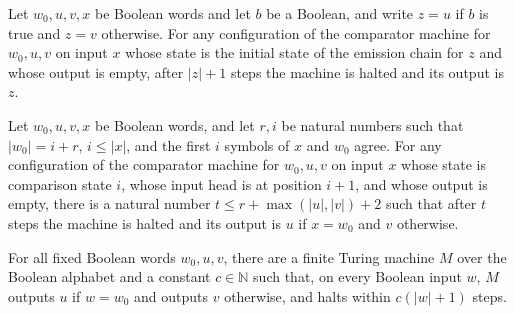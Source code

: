 \begin{lemma}
\label{Turing.FinTM.ifEq_finish}
\leanok
{}
Let $w_0,u,v,x$ be Boolean words and let $b$ be a Boolean, and write $z=u$ if $b$ is
true and $z=v$ otherwise. For any configuration of the comparator machine for $w_0,u,v$
on input $x$ whose state is the initial state of the emission chain for $z$ and whose
output is empty, after $|z|+1$ steps the machine is halted and its output is $z$.
\end{lemma}

\begin{lemma}
\label{Turing.FinTM.ifEq_run}
\leanok
{}
Let $w_0,u,v,x$ be Boolean words, and let $r,i$ be natural numbers such that
$|w_0|=i+r$, $i\le |x|$, and the first $i$ symbols of $x$ and $w_0$ agree. For any
configuration of the comparator machine for $w_0,u,v$ on input $x$ whose state is
comparison state $i$, whose input head is at position $i+1$, and whose output is empty,
there is a natural number $t\le r+\max(|u|,|v|)+2$ such that after $t$ steps the machine
is halted and its output is $u$ if $x=w_0$ and $v$ otherwise.
\end{lemma}

\begin{theorem}
\label{Turing.FinTM.computesFunInTime_ifEq}
\leanok
{}
For all fixed Boolean words $w_0,u,v$, there are a finite Turing machine $M$ over the
Boolean alphabet and a constant $c\in\mathbb{N}$ such that, on every Boolean input $w$,
$M$ outputs $u$ if $w=w_0$ and outputs $v$ otherwise, and halts within $c(|w|+1)$ steps.
\end{theorem}

